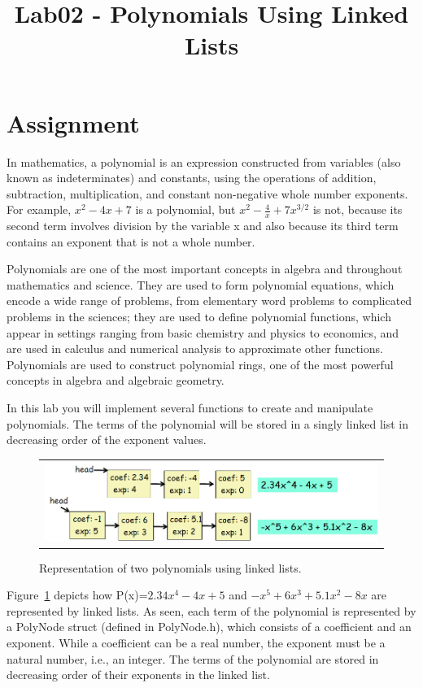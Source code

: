 \documentclass[10pt,dvipdfm]{article}
\title{Lab02 - Polynomials Using Linked Lists}
\date{}
\begin{document}
\maketitle

\vspace*{-2cm}

\noindent
%
\section{Assignment}
%
In mathematics, a polynomial is an expression constructed from variables (also known as indeterminates) and constants, 
using the operations of addition, subtraction, multiplication, and constant non-negative whole number exponents. 
For example, $x^2 - 4x + 7$ is a polynomial, but $x^2 - \frac{4}{x} + 7x^{3/2}$ is not, because its second term involves division by the 
variable x and also because its third term contains an exponent that is not a whole number.

Polynomials are one of the most important concepts in algebra and throughout mathematics and science. 
They are used to form polynomial equations, which encode a wide range of problems, from elementary word problems 
to complicated problems in the sciences; they are used to define polynomial functions, which appear in settings 
ranging from basic chemistry and physics to economics, and are used in calculus and numerical analysis to approximate 
other functions. Polynomials are used to construct polynomial rings, one of the most powerful concepts 
in algebra and algebraic geometry.

In this lab you will implement several functions to create and manipulate polynomials.
The terms of the polynomial will be stored in a singly linked list in decreasing order of the exponent values.

\begin{figure}[htbf]
\begin{center}
\begin{tabular}{c}
\includegraphics[width=5in]{FIG/1.png}
\end{tabular}
\caption{Representation of two polynomials using linked lists.}
\label{fig:poly} 
\end{center}
\end{figure}
%
Figure~\ref{fig:poly} depicts how P(x)=$2.34x^4 - 4x + 5$ and $-x^5 + 6x^3 + 5.1x^2 - 8x$ are 
represented by linked lists.
As seen, each term of the polynomial is represented by a PolyNode struct (defined in PolyNode.h), 
which consists of a coefficient and an exponent.
While a coefficient can be a real number, the exponent must be a natural number, i.e., an integer.
The terms of the polynomial are stored in decreasing order of their exponents in the linked list.
\end{document}
